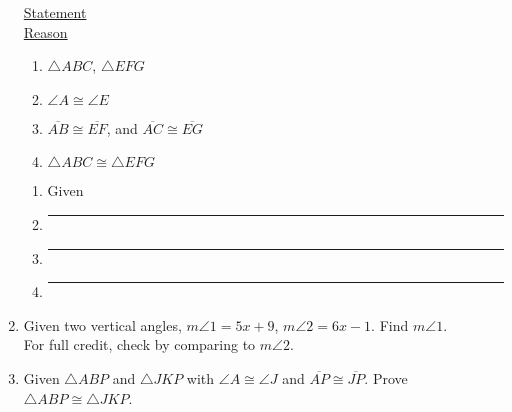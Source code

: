 \documentclass[12pt, twoside]{article}
\begin{document}
\begin{enumerate}
    \begin{multicols}{2}
      \underline{Statement} \\
      \underline{Reason}
    \end{multicols}
    \begin{multicols}{2}
      \raggedcolumns
      \begin{enumerate}[label={\arabic*)}]
        \item $\triangle ABC$, $\triangle EFG$
        \item $\angle A \cong \angle E$
        \item $\overline{AB} \cong \overline{EF}$, and $\overline{AC} \cong \overline{EG}$
        \item $\triangle ABC \cong \triangle EFG$ \\
      \end{enumerate}
      \begin{enumerate}[label={\arabic*)}]
        \item Given
        \item \rule{4cm}{0.15mm}
        \item \rule{4cm}{0.15mm}
        \item \rule{4cm}{0.15mm}
      \end{enumerate}
    \end{multicols}

  \item Given two vertical angles, $m \angle 1 = 5x+9$, $m \angle 2 = 6x-1$. Find $m \angle 1$.\\
    For full credit, check by comparing to $m\angle 2$.
      \begin{flushright}
      \end{flushright}

\newpage
  \item Given $\triangle ABP$ and $\triangle JKP$ with $\angle A \cong \angle J$ and $\overline{AP} \cong \overline{JP}$. Prove $\triangle ABP \cong \triangle JKP$.\\[0.5cm]


\end{enumerate}
\end{document}
